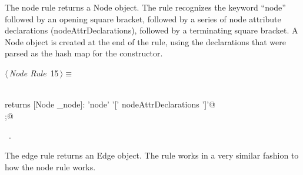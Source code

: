 \documentclass[a4paper]{report}
\begin{document}
The node rule returns a Node object. The rule recognizes the keyword ``node'' followed by an opening square bracket, followed by a series of node attribute declarations (nodeAttrDeclarations), followed by a terminating square bracket. A Node object is created at the end of the rule, using the declarations that were parsed as the hash map for the constructor.

\begin{flushleft} \small
\begin{minipage}{\linewidth}\label{scrap15}\raggedright\small
{} $\langle\,${\itshape Node Rule}\nobreak\ {\footnotesize {15}}$\,\rangle\equiv$
\vspace{-1ex}
\begin{list}{}{} \item
\mbox{}\verb@@\\
\mbox{}\verb@node returns [Node _node]: 'node' '[' nodeAttrDeclarations ']'@\\
\mbox{};@\\
\mbox{}\verb@@{\NWsep}
\end{list}
\vspace{-1.5ex}
\footnotesize
\begin{list}{}{\setlength{\itemsep}{-\parsep}\setlength{\itemindent}{-\leftmargin}}
\item \NWtxtMacroRefIn\ .

\item{}
\end{list}
\end{minipage}\vspace{4ex}
\end{flushleft}
The edge rule returns an Edge object. The rule works in a very similar fashion to how the node rule works.
\end{document}
